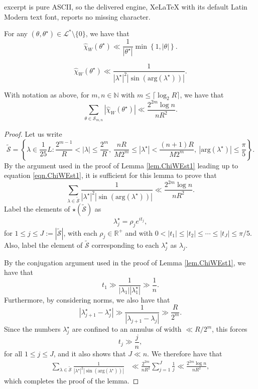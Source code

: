 \documentclass[10pt,a4paper]{amsart}
\newcommand{\N}{\mathbb{N}}
\newcommand{\R}{\mathbb{R}}
\newcommand{\cL}{\mathcal{L}}
\newcommand{\mc}{\mathcal}
\newcommand{\mr}{\mathrm}
\begin{document}
excerpt is pure ASCII, so the delivered engine, XeLaTeX with its default Latin Modern text font, reports no missing character.
\begin{lemma}\label{lem.ChiWEst1}
	For any $(\theta,\theta^\star)\in \cL^*\setminus\{0\}$, we have that
	\[\widehat{\chi}_W(\theta^\star)\ll\frac{1}{|\theta^\star|}\min\left\{1,|\theta|\right\}.\]
\end{lemma}

	\begin{equation}\label{eqn.ChiWEst1}
		\widehat{\chi}_W(\theta^\star)\ll\frac{1}{|\lambda^\star|^2|\sin(\mathrm{arg}(\lambda^\star))|}.
	\end{equation}

\begin{lemma}\label{lem.ChiWEst2}
	With notation as above, for $m,n\in\N$ with $m\le\lceil \log_2R\rceil$, we have that
	\[\sum_{\theta\in\mc{S}_{m,n}}|\widehat{\chi}_W(\theta^\star)|\ll\frac{2^{2m}\log n}{nR^2}.\]
\end{lemma}

\begin{proof}
	Let us write
	\[\tilde{\mc{S}}=\left\{\lambda\in \frac{1}{25}L :  \frac{2^{m-1}}{R}<|\lambda|\le\frac{2^m}{R},~\frac{nR}{M2^m}\le|\lambda^\star|<\frac{(n+1)R}{M2^m},~|\mr{arg}(\lambda^\star)|\le \frac{\pi}{5}\right\}.\]
	By the argument used in the proof of Lemma \ref{lem.ChiWEst1} leading up to equation \eqref{eqn.ChiWEst1}, it is sufficient for this lemma to prove that
	\begin{equation*}
		\sum_{\lambda\in\tilde{\mc{S}}}\frac{1}{|\lambda^\star|^2|\sin(\mathrm{arg}(\lambda^\star))|}\ll\frac{2^{2m}\log n}{nR^2}.
	\end{equation*}
	Label the elements of $\star(\tilde{\mc{S}})$ as
	\[\lambda_j^\star=\rho_je^{it_j},\]
	for $1\le j\le J:=|\tilde{\mc{S}}|$, with each $\rho_j\in\R^+$ and with $0< |t_1|\le |t_2|\le\cdots \le |t_J|\le\pi/5$. Also, label the element of $\tilde{\mc{S}}$ corresponding to each $\lambda_j^\star$ as $\lambda_j$.
	
	By the conjugation argument used in the proof of Lemma \ref{lem.ChiWEst1}, we have that
	\[t_1\gg \frac{1}{|\lambda_1||\lambda_1^\star|}\gg\frac{1}{n}.\]
	Furthermore, by considering norms, we also have that
	\[|\lambda_{j+1}^\star-\lambda_{j}^\star|\gg \frac{1}{|\lambda_{j+1}-\lambda_j|}\gg\frac{R}{2^m}.\]
	Since the numbers $\lambda_j^\star$ are confined to an annulus of width $\ll R/2^m$, this forces
	\[t_j\gg\frac{j}{n},\]
	for all $1\le j\le J$, and it also shows that $J\ll n$. We therefore have that
	\begin{align*}
		\sum_{\lambda\in\tilde{\mc{S}}}\frac{1}{|\lambda^\star|^2|\sin(\mathrm{arg}(\lambda^\star))|}&\ll\frac{2^{2m}}{nR^2}\sum_{j=1}^J\frac{1}{j}\ll\frac{2^{2m}\log n}{nR^2},
	\end{align*}
	which completes the proof of the lemma.
\end{proof}
\end{document}
